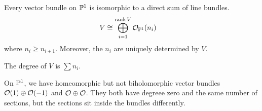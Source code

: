 \documentclass[12pt]{article}
\begin{document}
\begin{theorem}
    Every vector bundle on $\P^1$ is isomorphic to a direct sum of line bundles.
\begin{align*}
    V & \cong \bigoplus_{i=1}^{\operatorname{rank} V} \mathcal{O}_{\P^1}(n_i)
\end{align*}
where $n_i \geq n_{i+1}$. Moreover, the $n_i$ are uniquely determined by $V$.
\end{theorem}
The degree of $V$ is $\sum n_i$. 
\begin{example}
    On $\P^1$, we have homeomorphic but not biholomorphic vector bundles $\cO(1) \oplus \cO(-1)$ and $\cO \oplus \cO$. They both have degreee zero and the same number of sections, but the sections sit inside the bundles differently.
\end{example}
\end{document}
